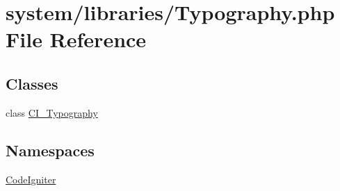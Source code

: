 \hypertarget{_typography_8php}{}\section{system/libraries/\+Typography.php File Reference}
\label{_typography_8php}
\subsection*{Classes}
\begin{DoxyCompactItemize}
\item 
class \mbox{\hyperlink{class_c_i___typography}{C\+I\+\_\+\+Typography}}
\end{DoxyCompactItemize}
\subsection*{Namespaces}
\begin{DoxyCompactItemize}
\item 
 \mbox{\hyperlink{namespace_code_igniter}{Code\+Igniter}}
\end{DoxyCompactItemize}
